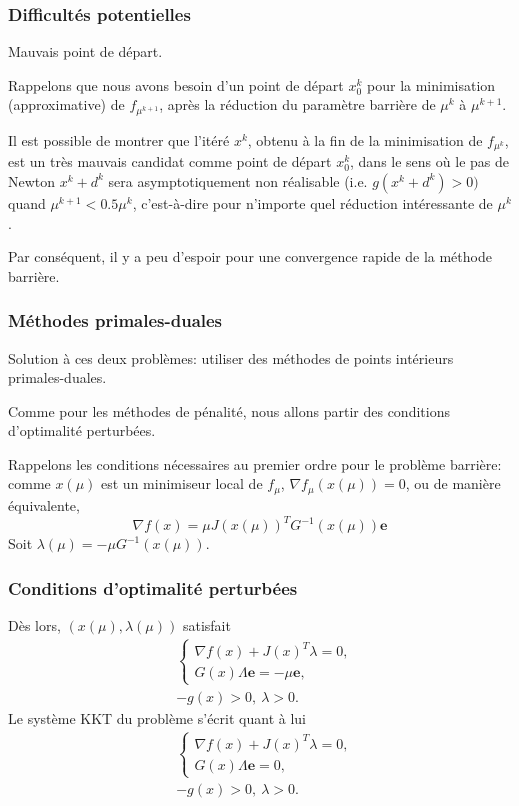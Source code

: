 \documentclass[usepdftitle=false]{beamer}
\def\be{\boldsymbol{e}}
\begin{document}
\begin{frame}
\frametitle{Difficultés potentielles}

Mauvais point de départ.

\mbox{}

Rappelons que nous avons besoin d'un point de départ $x_0^k$ pour la minimisation (approximative) de $f_{\mu^{k+1}}$, après la réduction du paramètre barrière de $\mu^k$ à $\mu^{k+1}$.

\mbox{}

Il est possible de montrer que l'itéré $x^k$, obtenu à la fin de la minimisation de $f_{\mu^k}$, est un très mauvais candidat comme point de départ $x_0^k$, dans le sens où le pas de Newton $x^k + d^k$ sera asymptotiquement non réalisable (i.e. $g(x^k + d^k) > 0)$ quand $\mu^{k+1} < 0.5 \mu^k$, c'est-à-dire pour n'importe quel réduction intéressante de $\mu^k$.

\mbox{}

Par conséquent, il y a peu d'espoir pour une convergence rapide de la méthode barrière.

\end{frame}

\begin{frame}
\frametitle{Méthodes primales-duales}

Solution à ces deux problèmes: utiliser des méthodes de points intérieurs primales-duales.

\mbox{}

Comme pour les méthodes de pénalité, nous allons partir des conditions d'optimalité perturbées.

\mbox{}

Rappelons les conditions nécessaires au premier ordre pour le problème barrière:
comme $x(\mu)$ est un minimiseur local de $f_\mu$, $\nabla f_{\mu}(x(\mu)) = 0$, ou
de manière équivalente,
$$
\nabla f(x) = \mu J(x(\mu))^T G^{-1}(x(\mu)) \be
$$
Soit $\lambda(\mu) = -\mu G^{-1}(x(\mu))$.

\end{frame}

\begin{frame}
\frametitle{Conditions d'optimalité perturbées}

Dès lors, $(x(\mu), \lambda(\mu))$ satisfait
\begin{align*}
& \begin{cases}
\nabla f(x) + J(x)^T\lambda = 0, \\
G(x)\Lambda\be = -\mu\be,
\end{cases} \\
& -g(x) > 0,\ \lambda > 0.
\end{align*}
Le système KKT du problème s'écrit quant à lui
\begin{align*}
& \begin{cases}
\nabla f(x) + J(x)^T\lambda = 0, \\
G(x)\Lambda\be = 0,
\end{cases} \\
& -g(x) > 0,\ \lambda > 0.
\end{align*}

\end{frame}
\end{document}
